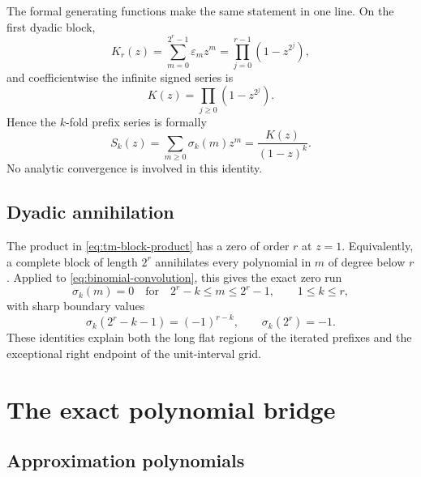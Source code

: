 \documentclass[11pt,oneside]{article}
\theoremstyle{definition}
\theoremstyle{remark}
\begin{document}
The formal generating functions make the same statement in one line.  On the
first dyadic block,
\begin{equation}
 K_r(z)=\sum_{m=0}^{2^r-1}\varepsilon_m z^m
       =\prod_{j=0}^{r-1}(1-z^{2^j}),                      \label{eq:tm-block-product}
\end{equation}
and coefficientwise the infinite signed series is
\begin{equation}
 K(z)=\prod_{j\ge0}(1-z^{2^j}).                            \label{eq:tm-infinite-product}
\end{equation}
Hence the $k$-fold prefix series is formally
\begin{equation}
 S_k(z)=\sum_{m\ge0}\sigma_k(m)z^m=\frac{K(z)}{(1-z)^k}.  \label{eq:prefix-series}
\end{equation}
No analytic convergence is involved in this identity.

\subsection{Dyadic annihilation}

The product in \eqref{eq:tm-block-product} has a zero of order $r$ at $z=1$.
Equivalently, a complete block of length $2^r$ annihilates every polynomial in
$m$ of degree below $r$.  Applied to \eqref{eq:binomial-convolution}, this gives
the exact zero run
\begin{equation}
 \sigma_k(m)=0
 \quad\text{for}\quad
 2^r-k\le m\le2^r-1,
 \qquad 1\le k\le r,                                     \label{eq:zero-run}
\end{equation}
with sharp boundary values
\begin{equation}
 \sigma_k(2^r-k-1)=(-1)^{r-k},
 \qquad
 \sigma_k(2^r)=-1.                                        \label{eq:zero-run-boundary}
\end{equation}
These identities explain both the long flat regions of the iterated prefixes and
the exceptional right endpoint of the unit-interval grid.

\section{The exact polynomial bridge}
\label{sec:polynomial-bridge}

\subsection{Approximation polynomials}
\end{document}
